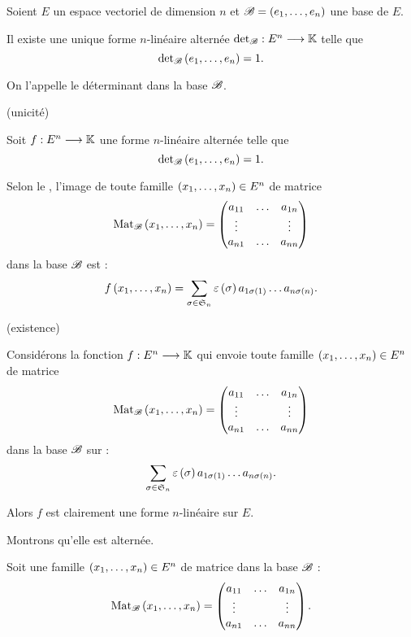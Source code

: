 \begin{deftheo}
Soient \(E\) un espace vectoriel de dimension \(n\) et \(\mathscr{B}=\left(e_1,\dots,e_n\right)\) une base de \(E\).

Il existe une unique forme \(n\)-linéaire alternée \(\detb:E^n\to\K\) telle que \[\detb\paren{e_1,\dots,e_n}=1.\]

On l'appelle le déterminant dans la base \(\mathscr{B}\).
\end{deftheo}

\begin{dem}

\analyse (unicité)

Soit \(f:E^n\longrightarrow\mathbb{K}\) une forme \(n\)-linéaire alternée telle que \[\detb\paren{e_1,\dots,e_n}=1.\]

Selon le , l'image de toute famille \(\left(x_1,\dots,x_n\right)\in E^n\) de matrice \[\Mat{x_1,\dots,x_n}=\begin{pmatrix}
a_{11} & \dots & a_{1n} \\
\vdots &  & \vdots \\
a_{n1} & \dots & a_{nn}
\end{pmatrix}\] dans la base \(\mathscr{B}\) est : \[f\left(x_1,\dots,x_n\right)=\sum_{\sigma\in\frak{S}_{n}}\varepsilon\left(\sigma\right)a_{1\sigma\left(1\right)}\dots a_{n\sigma\left(n\right)}.\]

\synthese (existence)

Considérons la fonction \(f:E^n\longrightarrow\mathbb{K}\) qui envoie toute famille \(\left(x_1,\dots,x_n\right)\in E^n\) de matrice \[\Mat{x_1,\dots,x_n}=\begin{pmatrix}
a_{11} & \dots & a_{1n} \\
\vdots &  & \vdots \\
a_{n1} & \dots & a_{nn}
\end{pmatrix}\] dans la base \(\mathscr{B}\) sur : \[\sum_{\sigma\in\frak{S}_{n}}\varepsilon\left(\sigma\right)a_{1\sigma\left(1\right)}\dots a_{n\sigma\left(n\right)}.\]

Alors \(f\) est clairement une forme \(n\)-linéaire sur \(E\).

Montrons qu'elle est alternée.

Soit une famille \(\left(x_1,\dots,x_n\right)\in E^n\) de matrice dans la base \(\mathscr{B}\) : \[\Mat{x_1,\dots,x_n}=\begin{pmatrix}
a_{11} & \dots & a_{1n} \\
\vdots &  & \vdots \\
a_{n1} & \dots & a_{nn}
\end{pmatrix}.\]


\end{dem}
